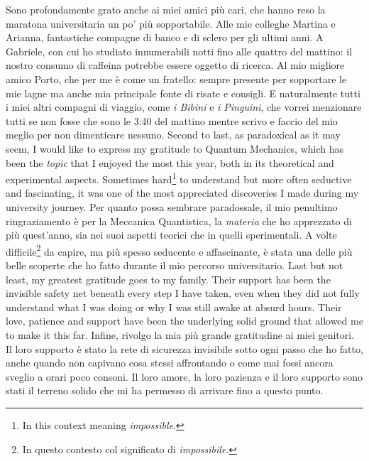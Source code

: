 \begin{paracol}{2}
    \switchcolumn
    Sono profondamente grato anche ai miei amici più cari, che hanno reso la maratona universitaria un po' più sopportabile. Alle mie colleghe Martina e Arianna, fantastiche compagne di banco e di sclero per gli ultimi anni. A Gabriele, con cui ho studiato innumerabili notti fino alle quattro del mattino: il nostro consumo di caffeina potrebbe essere oggetto di ricerca. Al mio migliore amico Porto, che per me è come un fratello: sempre presente per sopportare le mie lagne ma anche mia principale fonte di risate e consigli. E naturalmente tutti i miei altri compagni di viaggio, come \emph{i Bibini} e \emph{i Pinguini}, che vorrei menzionare tutti se non fosse che sono le 3:40 del mattino mentre scrivo e faccio del mio meglio per non dimenticare nessuno.
    \switchcolumn*
    Second to last, as paradoxical as it may seem, I would like to express my gratitude to Quantum Mechanics, which has been the \emph{topic} that I enjoyed the most this year, both in its theoretical and experimental aspects. Sometimes hard\footnote{In this context meaning \emph{impossible}.} to understand but more often seductive and fascinating, it was one of the most appreciated discoveries I made during my university journey.
    \switchcolumn
    Per quanto possa sembrare paradossale, il mio penultimo ringraziamento è per la Meccanica Quantistica, la \emph{materia} che ho apprezzato di più quest'anno, sia nei suoi aspetti teorici che in quelli sperimentali. A volte difficile\footnote{In questo contesto col significato di \emph{impossibile}.} da capire, ma più spesso seducente e affascinante, è stata una delle più belle scoperte che ho fatto durante il mio percorso universitario.
    \switchcolumn*
    Last but not least, my greatest gratitude goes to my family. Their support has been the invisible safety net beneath every step I have taken, even when they did not fully understand what I was doing or why I was still awake at absurd hours. Their love, patience and support have been the underlying solid ground that allowed me to make it this far.
    \switchcolumn
    Infine, rivolgo la mia più grande gratitudine ai miei genitori. Il loro supporto è stato la rete di sicurezza invisibile sotto ogni passo che ho fatto, anche quando non capivano cosa stessi affrontando o come mai fossi ancora sveglio a orari poco consoni. Il loro amore, la loro pazienza e il loro supporto sono stati il terreno solido che mi ha permesso di arrivare fino a questo punto.
\end{paracol}